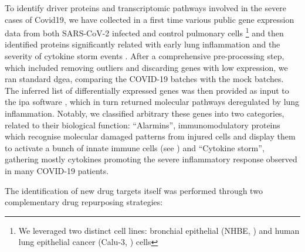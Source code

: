 {To identify driver proteins and transcriptomic pathways involved in the severe cases of Covid19,  we have collected in a first time various public gene expression data from both SARS-CoV-2 infected and control pulmonary cells \footnote{We leveraged two distinct cell lines: bronchial epithelial (NHBE, \autocite{blanco-melo_etal20}) and human lung epithelial cancer (Calu-3, \autocite{ackermann_etal20}) cells} and then identified proteins significantly related with early lung inflammation and the severity of cytokine storm events \autocite{merad_martin20}. 
After a comprehensive pre-processing step, which included removing outliers and discarding genes with low expression, we ran standard \acrfull{dgea}, comparing the COVID-19 batches with the mock batches. The inferred list of differentially expressed genes was then provided as input to the \acrfull{ipa} software \autocite{kramer_etal14}, which in turn returned molecular pathways deregulated by lung inflammation. Notably, we classified arbitrary these genes into two categories, related to their biological function: \enquote{Alarmins}, immunomodulatory proteins which recognise molecular damaged patterns from injured cells and display them to activate a bunch of innate immune cells (see ) and \enquote{Cytokine storm}, gathering mostly cytokines promoting the severe inflammatory response observed in many COVID-19 patients. 

The identification of new drug targets itself was performed through two complementary drug repurposing strategies:

}

